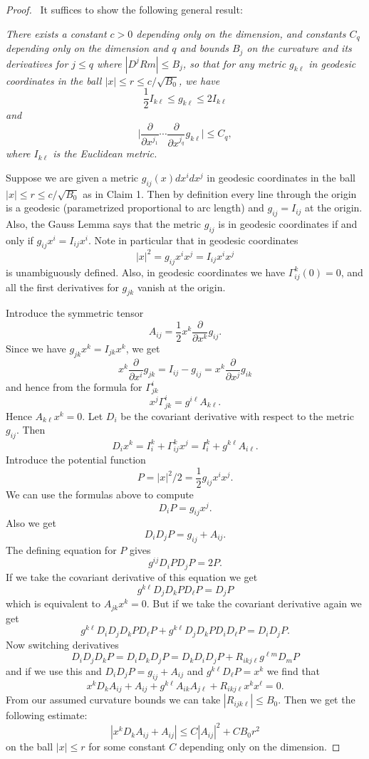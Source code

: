 \begin{proof}
\ It suffices to show the
following general result:

\medskip
{\it There exists a constant $c>0$ depending only on the
dimension, and constants $C_q$ depending only on the dimension and
$q$ and bounds $B_j$ on the curvature and its derivatives for $j
\leq q$ where $|D^jRm| \leq B_j$, so that for any metric $g_{k
\ell}$ in geodesic coordinates in the ball $|x| \leq r \leq c/
\sqrt{B_0}$, we have
$$
\frac{1}{2} I_{k \ell} \leq g_{k \ell} \leq 2I_{k \ell}
$$
and
$$
\Big| \frac{\partial}{\partial x^{j_1}} \cdots
\frac{\partial}{\partial x^{j_q}} g_{k \ell} \Big| \leq C_q,
$$
where $I_{k\ell}$ is the Euclidean metric.}

\medskip
Suppose we are given a metric $g_{ij}(x)dx^idx^j$ in geodesic
coordinates in the ball $|x| \leq r \leq c/ \sqrt{B_0}$ as in
Claim 1. Then by definition every line through the origin is a
geodesic (parametrized proportional to arc length) and
$g_{ij}=I_{ij}$ at the origin. Also, the Gauss Lemma says that the
metric $g_{ij}$ is in geodesic coordinates if and only if
$g_{ij}x^i=I_{ij}x^i$. Note in particular that in geodesic
coordinates
$$
|x|^2=g_{ij}x^ix^j=I_{ij}x^ix^j
$$
is unambiguously defined. Also, in geodesic coordinates we have
$\Gamma^k_{ij}(0)=0$, and all the first derivatives for $g_{jk}$
vanish at the origin.

Introduce the symmetric tensor
$$
A_{ij} = \frac{1}{2} x^k \frac{\partial}{\partial x^k} g_{ij}.
$$
Since we have $g_{jk}x^k=I_{jk}x^k$, we get
$$
x^k \frac{\partial}{\partial x^i}g_{jk} = I_{ij}-g_{ij}=x^k
\frac{\partial}{\partial x^j}g_{ik}
$$
and hence from the formula for $\Gamma^i_{jk}$
$$
x^j \Gamma^i_{jk}=g^{i \ell}A_{k \ell}.
$$
Hence $A_{k \ell}x^k=0$. Let $D_i$ be the covariant derivative
with respect to the metric $g_{ij}$. Then
$$
D_ix^k=I^k_i+ \Gamma^k_{ij}x^j=I^k_i+g^{k \ell}A_{i \ell}.
$$
Introduce the potential function
$$
P=|x|^2/2 = \frac{1}{2}g_{ij}x^ix^j.
$$
We can use the formulas above to compute
$$
D_iP=g_{ij}x^j.
$$
Also we get
$$
D_iD_jP=g_{ij}+A_{ij}.
$$
The defining equation for $P$ gives
$$
g^{ij}D_iPD_jP=2P.
$$
If we take the covariant derivative of this equation we get
$$
g^{k \ell}D_jD_kPD_{\ell}P=D_jP
$$
which is equivalent to $A_{jk}x^k=0$. But if we take the covariant
derivative again we get
$$
g^{k \ell}D_iD_jD_kPD_\ell P + g^{k \ell}D_jD_kPD_iD_\ell P = D_i
D_j P.
$$
Now switching derivatives
$$
D_iD_jD_kP=D_iD_kD_jP=D_kD_iD_jP+R_{ikj \ell}g^{\ell m}D_mP
$$
and if we use this and $D_iD_jP=g_{ij}+A_{ij}$ and $g^{k
\ell}D_{\ell}P=x^k$ we find that
$$
x^kD_kA_{ij}+A_{ij}+g^{k \ell} A_{ik}A_{j \ell} + R_{ikj \ell}x^k
x^\ell=0.
$$
{}From our assumed curvature bounds we can take $|R_{ijk \ell}|
\leq B_0$. Then we get the following estimate:
$$
|x^kD_kA_{ij}+A_{ij}| \leq C|A_{ij}|^2+CB_0 r^2
$$
on the ball $|x| \leq r$ for some constant $C$ depending only on
the dimension.


\end{proof}

